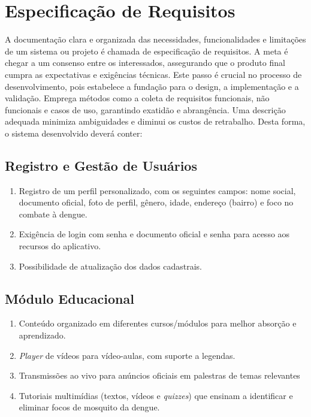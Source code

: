 \documentclass[a4paper, 12pt]{article}
\begin{document}
\newpage
\section{Especificação de Requisitos}\label{sec:requisitos}

A documentação clara e organizada das necessidades, funcionalidades e limitações de um sistema ou projeto é chamada de especificação de requisitos.  A meta é chegar a um consenso entre os interessados, assegurando que o produto final cumpra as expectativas e exigências técnicas.  Este passo é crucial no processo de desenvolvimento, pois estabelece a fundação para o design, a implementação e a validação.  Emprega métodos como a coleta de requisitos funcionais, não funcionais e casos de uso, garantindo exatidão e abrangência.  Uma descrição adequada minimiza ambiguidades e diminui os custos de retrabalho. Desta forma, o sistema desenvolvido deverá conter:

\subsection{Registro e Gestão de Usuários}
\begin{enumerate}
    \item Registro de um perfil personalizado, com os seguintes campos: nome social, documento oficial, foto de perfil, gênero, idade, endereço (bairro) e foco no combate à dengue.
    \item Exigência de login com senha e documento oficial e senha para acesso aos recursos do aplicativo.
    \item Possibilidade de atualização dos dados cadastrais.
\end{enumerate}

\subsection{Módulo Educacional}
\begin{enumerate}
    \item Conteúdo organizado em diferentes cursos/módulos para melhor absorção e aprendizado.
    \item \textit{Player} de vídeos para vídeo-aulas, com suporte a legendas.
    \item Transmissões ao vivo para anúncios oficiais em palestras de temas relevantes
    \item Tutoriais multimídias (textos, vídeos e \textit{quizzes}) que ensinam a identificar e eliminar focos de mosquito da dengue.
\end{enumerate}
\end{document}
